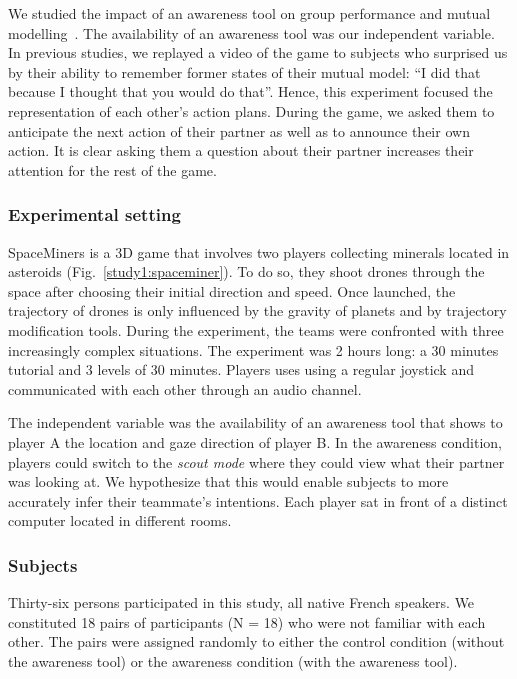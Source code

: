 \documentclass[twocolumn]{article}
\begin{document}
We studied the impact of an awareness tool on group performance and mutual
modelling~\citep{nova2007collaboration}. The availability
of an awareness tool was our independent variable. In previous studies, we
replayed a video of the game to subjects who surprised us by their ability to
remember former states of their mutual model: ``I did that because I thought that
you would do that''. Hence, this experiment focused the representation of each
other's action plans. During the game, we asked them to anticipate the next
action of their partner as well as to announce their own action. It is clear
asking them a question about their partner increases their attention for the
rest of the game.

\subsubsection*{Experimental setting}

SpaceMiners is a 3D game that involves two players collecting minerals located
in asteroids (Fig.~\ref{study1:spaceminer}). To do so, they shoot drones through
the space after choosing their initial direction and speed. Once launched, the
trajectory of drones is only influenced by the gravity of planets and by
trajectory modification tools.  During the experiment, the teams were confronted
with three increasingly complex situations. The experiment was 2 hours long: a
30 minutes tutorial and 3 levels of 30 minutes. Players uses using a regular
joystick and communicated with each other through an audio channel.

The independent variable was the availability of an awareness tool that shows to
player A  the location and gaze direction of player B. In the awareness
condition, players could switch to the \emph{scout mode} where they could view what
their partner was looking at. We hypothesize that this would enable subjects to
more accurately infer their teammate's intentions. Each player sat in front of a
distinct computer located in different rooms. 

\subsubsection*{Subjects}

Thirty-six persons participated in this study, all native French speakers. We
constituted 18 pairs of participants (N = 18) who were not familiar with each
other. The pairs were assigned randomly to either the control condition (without
the awareness tool) or the awareness condition (with the awareness tool).
\end{document}
